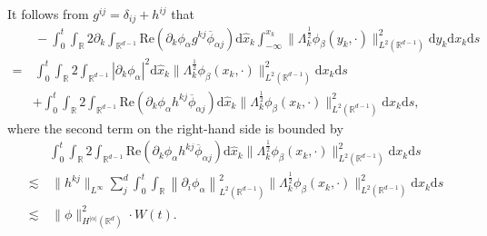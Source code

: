 \documentclass[10pt,twoside,a4paper]{article}
\numberwithin{equation}{section}\allowdisplaybreaks
\begin{document}
It follows from   $ g^{ij}=\delta_{ij}+h^{ij}$  that
\begin{align} \label{cener_c1_2}
	&\,-  \int_0^t\int_{\mathbb{R}}    	2 \partial_k \int_{\mathbb{R}^{d-1}} \mathrm{Re}\left(\partial_k \phi_{\alpha }  g^{kj} \overline{\phi}_{\alpha j}\right) \mathrm{d} \hat{x}_k\int_{-\infty}^{x_k} \|\Lambda_k^{\frac 12}\phi_{\beta}(y_k,\cdot)\|^2_{L^2(\mathbb{R}^{d-1})} \mathrm{d} y_k  \mathrm{d} x_k \mathrm{d} s \nonumber\\
	=&\,  \int_0^t\int_{\mathbb{R}}   	2  \int_{\mathbb{R}^{d-1}} \left|\partial_k \phi_{\alpha } \right|^2 \mathrm{d} \hat{x}_k\|\Lambda_k^{\frac 12}\phi_{\beta}(x_k,\cdot)\|^2_{L^2(\mathbb{R}^{d-1})}   \mathrm{d} x_k \mathrm{d} s\\
	&+ \int_0^t\int_{\mathbb{R}}   	2  \int_{\mathbb{R}^{d-1}} \mathrm{Re}\left(\partial_k \phi_{\alpha }  h^{kj} \overline{\phi}_{\alpha j}\right) \mathrm{d} \hat{x}_k\|\Lambda_k^{\frac 12}\phi_{\beta}(x_k,\cdot)\|^2_{L^2(\mathbb{R}^{d-1})}   \mathrm{d} x_k \mathrm{d} s,\nonumber
\end{align}
where the second term on the right-hand side is bounded by
\begin{align} \label{cener_c1_2_0}
	& \int_0^t\int_{\mathbb{R}}   	2  \int_{\mathbb{R}^{d-1}} \mathrm{Re}\left(\partial_k \phi_{\alpha }  h^{kj} \overline{\phi}_{\alpha j}\right) \mathrm{d} \hat{x}_k\|\Lambda_k^{\frac 12}\phi_{\beta}(x_k,\cdot)\|^2_{L^2(\mathbb{R}^{d-1})}   \mathrm{d} x_k \mathrm{d} s\nonumber\\ 
	\lesssim &\,	\|h^{kj}\|_{L^\infty} \sum_{j}^d \int_0^t\int_{\mathbb{R}} \left\| \partial_i\phi_{\alpha }\right\|_{L^2(\mathbb{R}^{d-1})}^2 \|\Lambda_k^{\frac 12}\phi_{\beta}(x_k,\cdot)\|^2_{L^2(\mathbb{R}^{d-1})}   \mathrm{d} x_k \mathrm{d} s\\
	\lesssim &\,\|\phi\|_{H^{|\alpha|}(\mathbb{R}^d)}^2\cdot W (t).\nonumber
\end{align}
\end{document}
